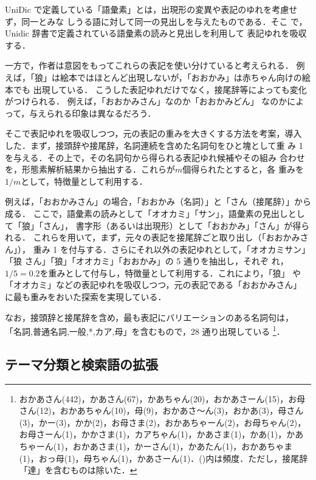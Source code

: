 \documentclass[japanese]{jnlp_1.4}
\begin{document}
UniDic で定義している「語彙素」とは，出現形の変異や表記のゆれを考慮せず，同一とみな
しうる語に対して同一の見出しを与えたものである\cite{Unidic}．そこ
で，Unidic 辞書で定義されている語彙素の読みと見出しを利用して
表記ゆれを吸収する．

一方で，作者は意図をもってこれらの表記を使い分けていると考えられる．
例えば，「狼」は絵本ではほとんど出現しないが，「おおかみ」は赤ちゃん向けの絵本でも
出現している．
こうした表記ゆれだけでなく，接尾辞等によっても変化がつけられる．
例えば，「おおかみさん」なのか「おおかみどん」
なのかによって，与えられる印象は異なるだろう．

そこで表記ゆれを吸収しつつ，元の表記の重みを大きくする方法を考案，導入
した．まず，接頭辞や接尾辞，名詞連続を含めた名詞句をひと塊として重
み 1 を与える．その上で，その名詞句から得られる表記ゆれ候補やその組み
合わせを，形態素解析結果から抽出する．これらが$m$個得られたとすると，各
重みを$1/m$として，特徴量として利用する．




例えば，「おおかみさん」の場合，「おおかみ（名詞）」と「さん（接尾辞）」から成る．
ここで，語彙素の読みとして「オオカミ」「サン」，語彙素の見出しとして「狼」「さん」，
書字形（あるいは出現形）として「おおかみ」「さん」が得られる．
これらを用いて，まず，元々の表記を接尾辞ごと取り出し（「おおかみさん」），
重み 1 を付与する．さらにそれ以外の表記ゆれとして，「オオカミサン」「狼
さん」「狼」「オオカミ」「おおかみ」の 5 通りを抽出し，それぞ
れ，$1/5=0.2$を重みとして付与し，特徴量として利用する．これにより，「狼」
や「オオカミ」などの表記ゆれを吸収しつつ，元の表記である「おおかみさん」
に最も重みをおいた探索を実現している．



なお，接頭辞と接尾辞を含め，最も表記にバリエーションのある名詞句は，
「名詞,普通名詞,一般,*,カア,母」を含むもので，28 通り出現している
\footnote{おかあさん(442)，かあさん(67)，かあちゃん(20)，おかあさーん(15)，お母さん(12)，おかあちゃん(10)，母(9)，おかあさ〜ん(3)，おかあ(3)，母さん(3)，かー(3)，かか(2)，お母さま(2)，おかあちゃーん(2)，お母ちゃん(2)，お母さーん(1)，かかさま(1)，カアちゃん(1)，かあさま(1)，かあ(1)，かあちゃーん(1)，おかあさま(1)，かーさん(1)，かあたん(1)，おかあちゃま(1)，おっ母(1)，母ちゃん(1)，かあさーん(1)．()内は頻度．ただし，接尾辞「達」を含むものは除いた．}．



\subsection{テーマ分類と検索語の拡張}
\label{sec:theme}
\end{document}
